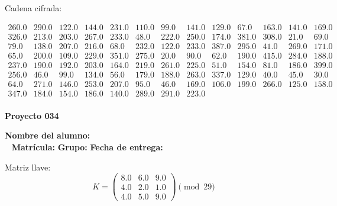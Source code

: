 \documentclass[12pt]{article}
\begin{document}
Cadena cifrada:
\begin{center}
$\begin{array}{lllllllllllll}
260.0 & 290.0 & 122.0 & 144.0 & 231.0 & 110.0 & 99.0 & 141.0 & 129.0 & 67.0 & 163.0 & 141.0 & 169.0\\
326.0 & 213.0 & 203.0 & 267.0 & 233.0 & 48.0 & 222.0 & 250.0 & 174.0 & 381.0 & 308.0 & 21.0 & 69.0\\
79.0 & 138.0 & 207.0 & 216.0 & 68.0 & 232.0 & 122.0 & 233.0 & 387.0 & 295.0 & 41.0 & 269.0 & 171.0\\
65.0 & 200.0 & 109.0 & 229.0 & 351.0 & 275.0 & 20.0 & 90.0 & 62.0 & 190.0 & 415.0 & 284.0 & 188.0\\
237.0 & 190.0 & 192.0 & 203.0 & 164.0 & 219.0 & 261.0 & 225.0 & 51.0 & 154.0 & 81.0 & 186.0 & 399.0\\
256.0 & 46.0 & 99.0 & 134.0 & 56.0 & 179.0 & 188.0 & 263.0 & 337.0 & 129.0 & 40.0 & 45.0 & 30.0\\
64.0 & 271.0 & 146.0 & 253.0 & 207.0 & 95.0 & 46.0 & 169.0 & 106.0 & 199.0 & 266.0 & 125.0 & 158.0\\
347.0 & 184.0 & 154.0 & 186.0 & 140.0 & 289.0 & 291.0 & 223.0\\
\end{array}$
\end{center}

\newpage


\textbf{Proyecto 034}

\textbf{Nombre del alumno:} \underline{\hspace{13cm}}\\\
\vspace{1cm}
\textbf{Matrícula:} \underline{\hspace{4cm}} \hspace{1cm}
\textbf{Grupo:} \underline{\hspace{2cm}}
\textbf{Fecha de entrega:} \underline{\hspace{2cm}}

\medskip

Matriz llave:
\[
K = \begin{pmatrix}
8.0 & 6.0 & 9.0\\
4.0 & 2.0 & 1.0\\
4.0 & 5.0 & 9.0
\end{pmatrix} \pmod{29}
\]
\end{document}
